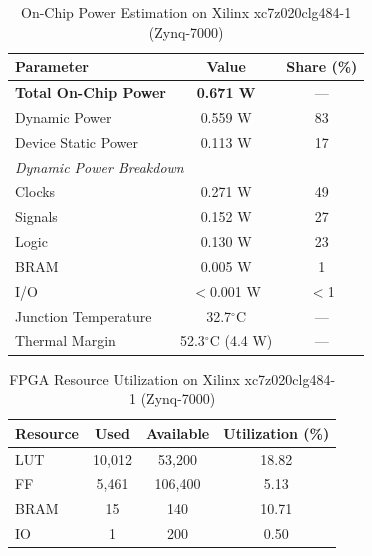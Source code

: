 \documentclass[conference]{IEEEtran}
\begin{document}
\begin{table}[t]
\renewcommand{\arraystretch}{1.3}
\caption{On-Chip Power Estimation on Xilinx xc7z020clg484-1 (Zynq-7000)}
\label{tab:power}
\centering
\begin{tabular}{lcc}
\toprule
\textbf{Parameter} & \textbf{Value} & \textbf{Share (\%)} \\
\midrule
\textbf{Total On-Chip Power} & \textbf{0.671 W} & --- \\
\quad Dynamic Power & 0.559 W & 83 \\
\quad Device Static Power & 0.113 W & 17 \\
\midrule
\multicolumn{3}{l}{\textit{Dynamic Power Breakdown}} \\
\quad Clocks & 0.271 W & 49 \\
\quad Signals & 0.152 W & 27 \\
\quad Logic & 0.130 W & 23 \\
\quad BRAM & 0.005 W & 1 \\
\quad I/O & $<$0.001 W & $<$1 \\
\midrule
Junction Temperature & 32.7$^{\circ}$C & --- \\
Thermal Margin & 52.3$^{\circ}$C (4.4 W) & --- \\
\bottomrule
\end{tabular}
\end{table}
\begin{table}[t]
\renewcommand{\arraystretch}{1.3}
\caption{FPGA Resource Utilization on Xilinx xc7z020clg484-1 (Zynq-7000)}
\label{tab:utilization}
\centering
\begin{tabular}{lccc}
\toprule
\textbf{Resource} & \textbf{Used} & \textbf{Available} & \textbf{Utilization (\%)} \\
\midrule
LUT & 10,012 & 53,200 & 18.82 \\
FF & 5,461 & 106,400 & 5.13 \\
BRAM & 15 & 140 & 10.71 \\
IO & 1 & 200 & 0.50 \\
\bottomrule
\end{tabular}
\end{table}
\end{document}
